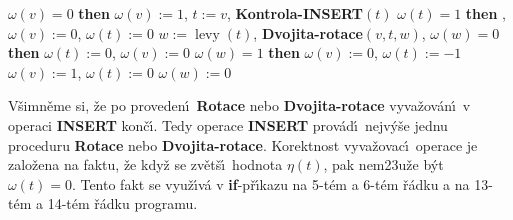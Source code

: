 \documentclass[a4paper,12pt]{article}
\DeclareMathOperator*{\levy}{levy}
\begin{document}
\phantom{---}{\bf else}\newline 
\phantom{------}{\bf if} $\omega (v)=0$ {\bf then}\newline 
\phantom{---------}$\omega (v):=1$, $t:=v$, {\bf Kontrola-INSERT}$(t)$\newline 
\phantom{------}{\bf else}\newline 
\phantom{---------}{\bf if} $\omega (t)=1$ {\bf then}\newline 
\phantom{------------}{\bf Rotace$(v,t)$}, $\omega (v):=0$, $\omega (t):=0$\newline 
\phantom{---------}{\bf else}\newline 
\phantom{------------}$w:=\levy(t)$, {\bf Dvojita-rotace$(v,t,w)$},\newline 
\phantom{------------}{\bf if} $\omega (w)=0$ {\bf then}\newline 
\phantom{---------------}$\omega (t):=0$, $\omega (v):=0$\newline 
\phantom{------------}{\bf else}\newline 
\phantom{---------------}{\bf if} $\omega (w)=1$ {\bf then}\newline 
\phantom{------------------}$\omega (v):=0$, $\omega(t):=-1$\newline 
\phantom{---------------}{\bf else}\newline 
\phantom{------------------}$\omega (v):=1$, $\omega (t):=0$\newline 
\phantom{---------------}{\bf endif}\newline 
\phantom{------------}{\bf endif}\newline 
\phantom{------------}$\omega (w):=0$\newline 
\phantom{---------}{\bf endif}\newline 
\phantom{------}{\bf endif}\newline 
\phantom{---}{\bf endif\newline 
endif}
\bigskip

\flushpar V\v simn\v eme si, \v ze po proveden\'\i\ {\bf Rotace} nebo
{\bf Dvojita-rotace} vyva\v zov\'an\'\i\ v operaci {\bf INSERT} kon\v c\'\i . Tedy 
operace {\bf INSERT} prov\'ad\'\i\ nejv\'y\v se jednu proceduru {\bf Rotace }
nebo {\bf Dvojita-rota\-ce}. Korektnost vyva\v zovac\'\i\ operace je 
zalo\v zena na faktu, \v ze kdy\v z se zv\v et\v s\'\i\ hodnota $
\eta (t)$, pak 
nem\accent23u\v ze b\'yt $\omega (t)=0$. Tento fakt se vyu\v z\'\i v\'a  v 
{\bf if}-p\v r\'\i kazu na 5-t\'em a 6-t\'em \v r\'adku a na 13-t\'em a 14-t\'em  
\v r\'adku programu.
\medskip
\end{document}
